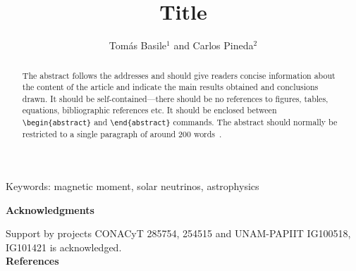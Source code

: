 \documentclass[12pt]{template/iopart}
\newcommand\keywords[1]{Keywords: #1}
\begin{document}
\title[Title]{Title}

\author{Tomás Basile$^1$ and Carlos Pineda$^2$}

\address{$^1$ Facultad de Ciencias. Universidad Nacional Autónoma de México, Ciudad de México 01000, Mexico}
\address{$^2$ Instituto de Física, Universidad Nacional Autónoma de México, Ciudad de México 01000, México}

\begin{abstract}
The abstract follows the addresses and
should give readers concise information about the content 
of the article and indicate the main results obtained and conclusions 
drawn. It should be self-contained---there should be no references to 
figures, tables, equations, bibliographic references etc.  It should be enclosed between \verb"\begin{abstract}"
and \verb"\end{abstract}" commands.  The abstract should normally be restricted 
to a single paragraph of around 200 words~\cite{bengtsson_zyczkowski_2017}.
\end{abstract}
\keywords{magnetic moment, solar neutrinos, astrophysics} \\
\submitto{\PS}
\maketitle








\newpage
\appendix




\textbf{Acknowledgments}

Support by projects CONACyT 285754, 254515 and UNAM-PAPIIT IG100518, IG101421 is
acknowledged.  \\


\textbf{References}


\end{document}
